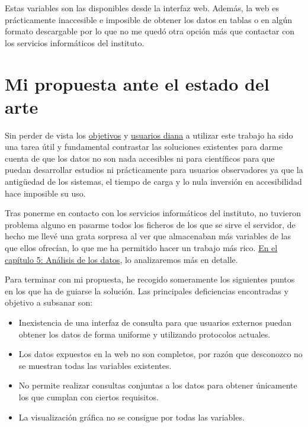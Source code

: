 Estas variables son las disponibles desde la interfaz web. Además, la web es prácticamente
inaccesible e imposible de obtener los datos en tablas o en algún formato descargable por
lo que no me quedó otra opción más que contactar con los servicios informáticos del
instituto.


\section{Mi propuesta ante el estado del arte}

Sin perder de vista los \hyperref[sec:obj]{objetivos} y \hyperref[sec:usu]{usuarios diana}
a utilizar este trabajo ha sido una tarea útil y fundamental contrastar las soluciones
existentes para darme cuenta de que los datos no son nada accesibles ni para científicos
para que puedan desarrollar estudios ni prácticamente para usuarios observadores ya que la
antigüedad de los sistemas, el tiempo de carga y lo nula inversión en accesibilidad hace
imposible su uso.

Tras ponerme en contacto con los servicios informáticos del instituto, no tuvieron
problema alguno en pasarme todos los ficheros de los que se sirve el servidor, de hecho me
llevé una grata sorpresa al ver que almacenaban más variables de las que ellos ofrecían,
lo que me ha permitido hacer un trabajo más rico. \hyperref[cap:5]{En el capítulo 5:
Análisis de los datos}, lo analizaremos más en detalle.


Para terminar con mi propuesta, he recogido someramente los siguientes puntos en los que
ha de guiarse la solución. Las principales deficiencias encontradas y objetivo a subsanar
son:
\begin{itemize}
    \item Inexistencia de una interfaz de consulta para que usuarios externos puedan
    obtener los datos de forma uniforme y utilizando protocolos actuales.
    \item Los datos expuestos en la web no son completos, por razón que desconozco no se
    muestran todas las variables existentes.
    \item No permite realizar consultas conjuntas a los datos para obtener únicamente
    los que cumplan con ciertos requisitos.
    \item La visualización gráfica no se consigue por todas las variables.
\end{itemize}
